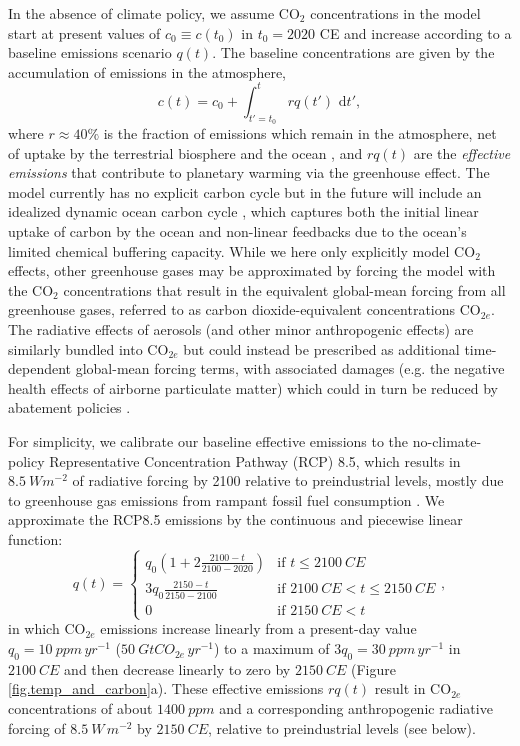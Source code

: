 \documentclass{article}
\begin{document}
In the absence of climate policy, we assume CO$_{2}$ concentrations in the model start at present values of $c_{0} \equiv c(t_{0})$ in $t_{0}=2020$ CE and increase according to a baseline emissions scenario $q(t)$. The baseline concentrations are given by the accumulation of emissions in the atmosphere,
\begin{equation}
c(t) = c_{0} + \int_{t'=t_{0}}^{t} rq(t') \text{ d}t',
\end{equation}
where $r \approx 40\%$ is the fraction of emissions which remain in the atmosphere, net of uptake by the terrestrial biosphere and the ocean \citep{solomon_irreversible_2009}, and $rq(t)$ are the \textit{effective emissions} that contribute to planetary warming via the greenhouse effect. The model currently has no explicit carbon cycle but in the future will include an idealized dynamic ocean carbon cycle \citep{glotter_simple_2014}, which captures both the initial linear uptake of carbon by the ocean and non-linear feedbacks due to the ocean's limited chemical buffering capacity. While we here only explicitly model CO$_{2}$ effects, other greenhouse gases may be approximated by forcing the model with the CO$_{2}$ concentrations that result in the equivalent global-mean forcing from all greenhouse gases, referred to as carbon dioxide-equivalent concentrations CO$_{2e}$. The radiative effects of aerosols (and other minor anthropogenic effects) are similarly bundled into CO$_{2e}$ but could instead be prescribed as additional time-dependent global-mean forcing terms, with associated damages (e.g. the negative health effects of airborne particulate matter) which could in turn be reduced by abatement policies \citep{thompson_systems_2014}.

For simplicity, we calibrate our baseline effective emissions to the no-climate-policy Representative Concentration Pathway (RCP) 8.5, which results in $\SI{8.5}{W m^{-2}}$ of radiative forcing by 2100 relative to preindustrial levels, mostly due to greenhouse gas emissions from rampant fossil fuel consumption \citep{riahi_scenarios_2007}. We approximate the RCP8.5 emissions by the continuous and piecewise linear function:
\begin{equation}
    q(t) = 
    \begin{cases}
        q_{0}(1 + 2\frac{2100-t}{2100-2020}) &\mbox{if } t \le \SI{2100}{CE} \\
        3q_{0}\frac{2150-t}{2150-2100} &\mbox{if } \SI{2100}{CE} < t \le \SI{2150}{CE} \\
        0 &\mbox{if } \SI{2150}{CE} < t
    \end{cases},\label{eq.baseline_emissions}
\end{equation}
in which CO$_{2e}$ emissions increase linearly from a present-day value $q_{0} = \SI{10}{ppm\, yr^{-1}}$ ($\SI{50}{GtCO_{2e}\, yr^{-1}}$) to a maximum of $3q_{0} = \SI{30}{ppm\, yr^{-1}}$ in $\SI{2100}{CE}$ and then decrease linearly to zero by $\SI{2150}{CE}$ (Figure \ref{fig.temp_and_carbon}a). These effective emissions $rq(t)$ result in CO$_{2e}$ concentrations of about $\SI{1400}{ppm}$ and a corresponding anthropogenic radiative forcing of $\SI{8.5}{W\, m^{-2}}$ by $\SI{2150}{CE}$, relative to preindustrial levels (see below).
\end{document}

